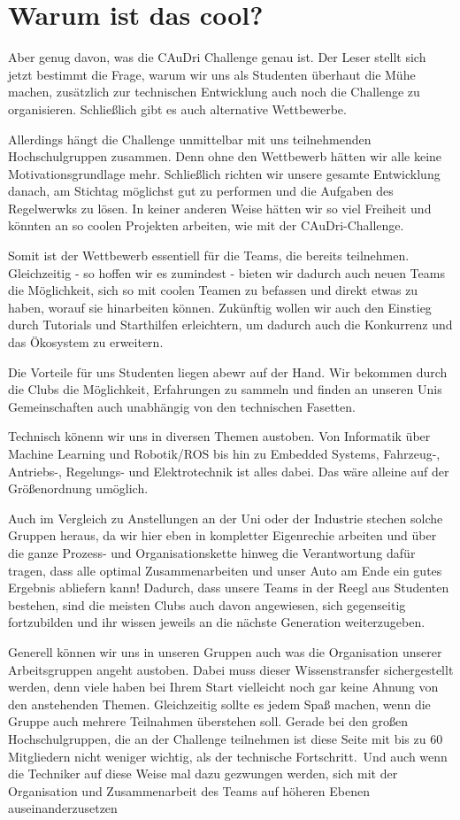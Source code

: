 \section{Warum ist das cool?}
Aber genug davon, was die CAuDri Challenge genau ist. 
Der Leser stellt sich jetzt bestimmt die Frage, warum wir uns als Studenten überhaut die Mühe machen, zusätzlich zur technischen Entwicklung auch noch die Challenge zu organisieren.
Schließlich gibt es auch alternative Wettbewerbe.

Allerdings hängt die Challenge unmittelbar mit uns teilnehmenden 
Hochschulgruppen zusammen.
Denn ohne den Wettbewerb hätten wir alle keine Motivationsgrundlage mehr.
Schließlich richten wir unsere gesamte Entwicklung danach, am Stichtag 
möglichst gut zu performen und die Aufgaben des Regelwerwks zu lösen.
In keiner anderen Weise hätten wir so viel Freiheit und könnten an so coolen Projekten 
arbeiten, wie mit der CAuDri-Challenge.

Somit ist der Wettbewerb essentiell für die Teams, die bereits teilnehmen.
Gleichzeitig - so hoffen wir es zumindest - bieten wir dadurch auch neuen Teams
die Möglichkeit, sich so mit coolen Teamen zu befassen und direkt etwas zu haben,
worauf sie hinarbeiten können. Zukünftig wollen wir auch den Einstieg durch Tutorials
und Starthilfen erleichtern, um dadurch auch die Konkurrenz und das Ökosystem zu erweitern.

Die Vorteile für uns Studenten liegen abewr auf der Hand. Wir bekommen durch 
die Clubs die Möglichkeit, Erfahrungen zu sammeln und finden an unseren Unis Gemeinschaften
auch unabhängig von den technischen Fasetten. 

Technisch könenn wir uns in diversen Themen austoben.
Von Informatik über Machine Learning und Robotik/ROS bis hin zu
Embedded Systems, Fahrzeug-, Antriebs-, Regelungs- und Elektrotechnik
ist alles dabei. Das wäre alleine auf der Größenordnung umöglich.

Auch im Vergleich zu Anstellungen an der Uni oder der Industrie stechen solche
Gruppen heraus, da wir hier eben in kompletter Eigenrechie arbeiten und über
die ganze Prozess- und Organisationskette hinweg die Verantwortung dafür tragen, 
dass alle optimal Zusammenarbeiten und unser Auto am Ende ein gutes Ergebnis abliefern kann!
Dadurch, dass unsere Teams in der Reegl aus Studenten bestehen, sind die meisten Clubs
auch davon angewiesen, sich gegenseitig fortzubilden und ihr wissen jeweils 
an die nächste Generation weiterzugeben. 

Generell können wir uns in unseren Gruppen auch was die Organisation unserer
Arbeitsgruppen angeht austoben. Dabei muss dieser Wissenstransfer sichergestellt werden,
denn viele haben bei Ihrem Start vielleicht noch gar keine
Ahnung von den anstehenden Themen. Gleichzeitig sollte es jedem Spaß machen,
wenn die Gruppe auch mehrere Teilnahmen überstehen soll. 
Gerade bei den großen Hochschulgruppen, die an der Challenge teilnehmen ist diese
Seite mit bis zu 60 Mitgliedern nicht weniger wichtig, als der technische Fortschritt.\
Und auch wenn die Techniker auf diese Weise mal dazu gezwungen werden, sich
mit der Organisation und Zusammenarbeit des Teams auf höheren Ebenen auseinanderzusetzen 


